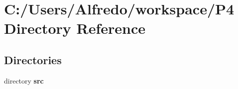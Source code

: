 \section{C\+:/\+Users/\+Alfredo/workspace/\+P4 Directory Reference}
\label{dir_63e21efa410948796fef454fc5ad1553}
\subsection*{Directories}
\begin{DoxyCompactItemize}
\item 
directory {\bf src}
\end{DoxyCompactItemize}

